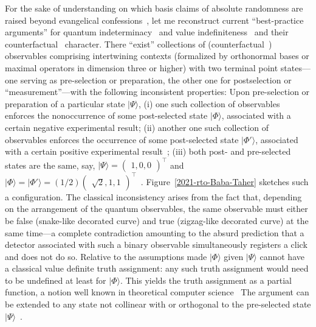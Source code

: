 \documentclass[entropy,article,accept,oneauthor,pdftex]{Definitions/mdpi}
\begin{document}
For the sake of understanding on which basis claims of absolute randomness are raised
beyond evangelical confessions~\cite{zeil-05_nature_ofQuantum,clauser-talkvie},
let me reconstruct current ``best-practice arguments'' for quantum indeterminacy~\cite{pitowsky:218} and
value indefiniteness~\cite{2015-AnalyticKS,svozil-2018-whycontexts} and their counterfactual~\cite{specker-60,specker-ges} character.
There ``exist'' collections of (counterfactual~\cite{specker-60}) observables comprising intertwining contexts (formalized by orthonormal bases or maximal operators in dimension three or higher)
with two terminal point states---one serving as pre-selection or preparation, the other one for postselection or ``measurement''---with the following inconsistent properties:
Upon pre-selection or preparation of a particular state   $\vert \Psi \rangle $,
(i) one such collection of observables enforces the nonoccurrence of some post-selected state $\vert \Phi \rangle $, associated with a certain negative experimental result;
(ii) another one such collection of observables enforces the occurrence
of some post-selected state $\vert \Phi' \rangle $,
associated with a certain positive experimental result~\cite{svozil-2006-omni,2018-minimalYIYS};
(iii) both post- and pre-selected states are the same, say,
$\vert \Psi \rangle = \begin{pmatrix} 1,0,0\end{pmatrix}^\intercal$ and
$\vert \Phi \rangle= \vert \Phi' \rangle =(1/2) \begin{pmatrix} \sqrt{2},1,1\end{pmatrix}^\intercal$~\cite{2015-AnalyticKS,svozil-2018-whycontexts,svozil-2020-c}.
Figure~\ref{2021-rto-Baba-Taher} sketches such a configuration.
The classical inconsistency arises from the fact that, depending on the arrangement of the quantum observables, the same observable must either be false (snake-like decorated curve)
and true (zigzag-like decorated curve) at the same time---a complete contradiction
amounting to the absurd prediction that a detector associated with such a binary observable simultaneously registers
a click and does not do so.
Relative to the assumptions made
$\vert \Phi \rangle$ given $\vert \Psi \rangle$
cannot have a classical value definite truth assignment:
any such truth assignment
would need to be undefined at least for $\vert \Phi \rangle$.
This yields the truth assignment as a partial function, a notion well known in theoretical computer science~\cite{Kleene1936}
The argument can be extended to any state not collinear with or orthogonal to the pre-selected state $\vert \Psi \rangle$~\cite{2015-AnalyticKS}.
\end{document}
